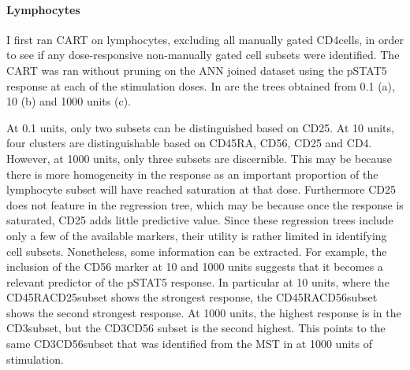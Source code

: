 \paragraph{Lymphocytes} 
I first ran CART on lymphocytes, excluding all manually gated CD4\positive cells, in order to see if any dose-responsive
non-manually gated cell subsets were identified.
The CART was ran without pruning on the ANN joined dataset using the pSTAT5 response at each of the stimulation doses.
In  are the trees obtained from 0.1 (a), 10 (b)
and 1000 units (c).

At 0.1 units, only two subsets can be distinguished based on CD25.  
At 10 units, four clusters are distinguishable based on CD45RA, CD56, CD25 and CD4.
However, at 1000 units, only three subsets are discernible.
This may be because there is more homogeneity in the response as
an important proportion of the lymphocyte subset will have reached saturation at that dose.
Furthermore CD25 does not feature in the regression tree,
which may be because once the response is saturated, CD25 adds little predictive value.
Since these regression trees include only a few of the available markers, their utility is rather limited in
identifying cell subsets.
Nonetheless, some information can be extracted.
For example, the inclusion of the CD56 marker at 10 and 1000 units suggests that it becomes a relevant predictor of the pSTAT5 response.
In particular at 10 units, where the CD45RA\negative CD25\positive subset shows the strongest response,
the CD45RA\positive CD56\high subset shows the second strongest response.
At 1000 units, the highest response is in the CD3\positive subset, but the CD3\negative CD56\positive
subset is the second highest.
This points to the same CD3\negative CD56\positive subset that was identified from the \gls{MST} in  at 1000 units of stimulation.



